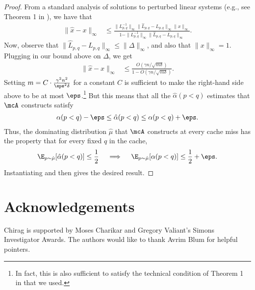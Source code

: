 \documentclass[11pt]{article}
\begin{document}
\begin{proof}
    From a standard analysis of solutions to perturbed linear systems (e.g., see Theorem 1 in \citep{falknotes}), we have that
    \begin{align*}
        \|\hat{x}-x\|_\infty &\le \frac{\|L_{p,q}^{-1}\|_\infty \|\hat{L}_{p,q}-L_{p,q}\|_\infty \|x\|_\infty}{1-\|L_{p,q}^{-1}\|_\infty \|\hat{L}_{p,q}-L_{p,q}\|_\infty}.
    \end{align*}
    Now, observe that $\|\hat{L}_{p,q}-L_{p,q}\|_\infty \le \|\Delta\|_\infty$, and also that $\|x\|_\infty=1$. Plugging in our bound above on $\Delta$, we get
    \begin{align*}
        \|\hat{x}-x\|_\infty &\le \frac{O(\gamma n/\sqrt{m\delta})}{1-O(\gamma n/\sqrt{m\delta})}.
    \end{align*}
    Setting $m=C \cdot \frac{\gamma^2n^2}{\eps^2\delta}$ for a constant $C$ is sufficient to make the right-hand side above to be at most $\eps$.\footnote{In fact, this is also sufficient to satisfy the technical condition of Theorem 1 in \citep{falknotes} that we used.} But this means that all the $\hat{\alpha}(p<q)$ estimates that $\mcA$ constructs satisfy
    \begin{align*}
        {\alpha}(p<q)-\eps \le \hat{\alpha}(p<q) \le {\alpha}(p<q) + \eps.
    \end{align*}
    Thus, the dominating distribution $\hat{\mu}$ that $\mcA$ constructs at every cache miss has the property that for every fixed $q$ in the cache,
    \begin{align*}
        \E_{p \sim \hat{\mu}}[\hat{\alpha}(p<q)] \le \frac{1}{2} 
        \quad\implies\quad \E_{p \sim \hat{\mu}}[{\alpha}(p<q)] \le \frac{1}{2}+\eps.
    \end{align*}
    Instantiating  and  then gives the desired result.
\end{proof}
 
\section*{Acknowledgements}
Chirag is supported by Moses Charikar and Gregory Valiant's Simons Investigator Awards. The authors would like to thank Avrim Blum for helpful pointers.



\end{document}
